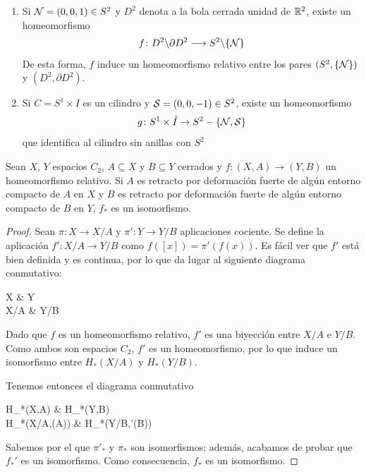 \begin{example}
\begin{enumerate}
\item Si $\mathcal{N}=(0,0,1) \in S^2$ y $D^2$ denota a la bola cerrada unidad de
$\mathbb{R}^2$, existe un homeomorfismo
\[f\colon D^2\backslash \partial D^2 \longrightarrow S^2\backslash\{\mathcal{N}\}\]
De esta forma, $f$ induce un homeomorfismo relativo entre los pares 
$(S^2,\{\mathcal{N}\})$ y $(D^2,\partial D^2)$.
\item Si $C=S^1\times I$ es un cilindro y $\mathcal{S}=(0,0,-1) \in S^2$, existe un
homeomorfismo
\[g\colon S^1\times \mathring{I} \to S^2-\{\mathcal{N},\mathcal{S}\}\]
que identifica al cilindro sin anillas con $S^2$
\end{enumerate}
\end{example}

\begin{theorem}
Sean $X$, $Y$ espacios $C_2$, $A \subseteq X$ y $B \subseteq Y$ cerrados y
$f\colon (X,A) \to (Y,B)$ un homeomorfismo relativo. Si $A$ es retracto por
deformación fuerte de algún entorno compacto de $A$ en $X$ y $B$ es retracto
por deformación fuerte de algún entorno compacto de $B$  en $Y$, $f_*$ es un
isomorfismo.
\end{theorem}

\begin{proof}
Sean $\pi\colon X \to X/A$ y $\pi'\colon Y \to Y/B$ aplicaciones cociente. Se
define la aplicación $f'\colon X/A \to Y/B$ como $f([x])=\pi'(f(x))$.
Es fácil ver que $f'$ está bien definida y es continua, por lo que da lugar
al siguiente diagrama conmutativo:
\begin{diag}
X   & Y \\
X/A  & Y/B
\end{diag}

Dado que $f$ es un homeomorfismo relativo, $f'$ es una biyección entre $X/A$
e $Y/B$. Como ambos son espacios $C_2$, $f'$ es un homeomorfismo, por lo que
induce un isomorfismo entre $H_*(X/A)$ y $H_*(Y/B)$.

Tenemos entonces el diagrama conmutativo
\begin{diag}
H_*(X,A)   & H_*(Y,B) \\
H_*(X/A,\pi(A))  & H_*(Y/B,\pi'(B))
\end{diag}

Sabemos por el  que $\pi'_*$ y $\pi_*$ son isomorfismos;
además, acabamos de probar que $f_*'$ es un isomorfismo. Como consecuencia,
$f_*$ es un isomorfismo.
\end{proof}
